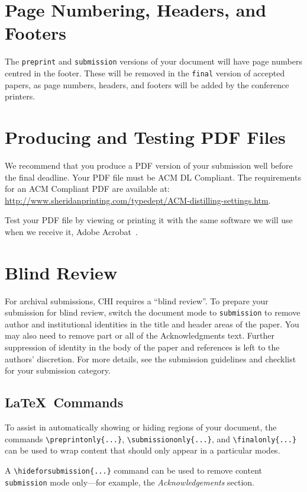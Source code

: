 \documentclass[preprint]{../latex/sigchi-modern}
\begin{document}
\section{Page Numbering, Headers, and Footers}
The \texttt{preprint} and \texttt{submission} versions of your document will
have page numbers centred in the footer. These will be removed in the
\texttt{final} version of accepted papers, as page numbers, headers, and footers
will be added by the conference printers.

\section{Producing and Testing PDF Files}
We recommend that you produce a PDF version of your submission well
before the final deadline. Your PDF file must be ACM DL Compliant. The
requirements for an ACM Compliant PDF are available at:
{\url{http://www.sheridanprinting.com/typedept/ACM-distilling-settings.htm}}.

Test your PDF file by viewing or printing it with the same software we will use
when we receive it, Adobe Acrobat~\cite{acrobat}.

\section{Blind Review}
For archival submissions, CHI requires a ``blind review''. To prepare your
submission for blind review, switch the document mode to \texttt{submission} to
remove author and institutional identities in the title and header areas of the
paper. You may also need to remove part or all of the Acknowledgments text.
Further suppression of identity in the body of the paper and references is left
to the authors' discretion. For more details, see the submission guidelines and
checklist for your submission category.

\subsection{\LaTeX\ Commands}
To assist in automatically showing or hiding regions of your document, the
commands \texttt{\textbackslash preprintonly\{...\}},
\texttt{\textbackslash sub\-mis\-sion\-only\{...\}}, and
\texttt{\textbackslash finalonly\{...\}} can be used to wrap content that should
only appear in a particular modes.

A \texttt{\textbackslash hideforsubmission\{...\}} command can be used to remove
content \texttt{submission} mode only---for example, the
\textit{Acknowledgements} section.
\end{document}
